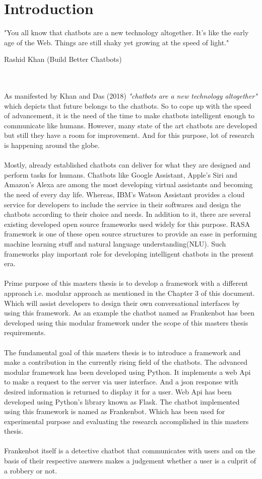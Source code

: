 \chapter{Introduction\label{cha:chapter1}}
\epigraph{"You all know that chatbots are a new technology altogether. It’s like the early age of the Web. Things are still shaky yet growing at the speed of light."}{Rashid Khan (Build Better Chatbots)}
\\~\\
As manifested by Khan and Das (2018) {\textit{"chatbots are a new technology altogether"} \cite{buildBetterChatbots}} which depicts that future belongs to the chatbots. So to cope up with the speed of advancement, it is the need of the time to make chatbots intelligent enough to communicate like humans. However, many state of the art chatbots are developed but still they have a room for improvement. And for this purpose, lot of research is happening around the globe.
\\~\\
Mostly, already established chatbots can deliver for what they are designed and perform tasks for humans. Chatbots like Google Assistant, Apple's Siri and Amazon's Alexa are among the most developing virtual assistants and becoming the need of every day life. Whereas, IBM's Watson Assistant provides a cloud service for developers to include the service in their softwares and design the chatbots according to their choice and needs. In addition to it, there are several existing developed open source frameworks used widely for this purpose. RASA framework is one of these open source structures to provide an ease in performing machine learning stuff and natural language understanding(NLU). Such frameworks play important role for developing intelligent chatbots in the present era. 
\\~\\
Prime purpose of this masters thesis is to develop a framework with a different approach i.e. modular approach as mentioned in the Chapter 3 of this document. Which will assist developers to design their own conversational interfaces by using this framework. As an example the chatbot named as Frankenbot has been developed using this modular framework under the scope of this masters thesis requirements.
\\~\\
The fundamental goal of this masters thesis is to introduce a framework and make a contribution in the currently rising field of the chatbots. The advanced modular framework has been developed using Python. It implements a web Api to make a request to the server via user interface. And a json response with desired information is returned to display it for a user. Web Api has been developed using Python's library known as Flask. The chatbot implemented using this framework is named as Frankenbot. Which has been used for experimental purpose and evaluating the research accomplished in this masters thesis. 
\\~\\
Frankenbot itself is a detective chatbot that communicates with users and on the basis of their respective answers makes a judgement whether a user is a culprit of a robbery or not.

